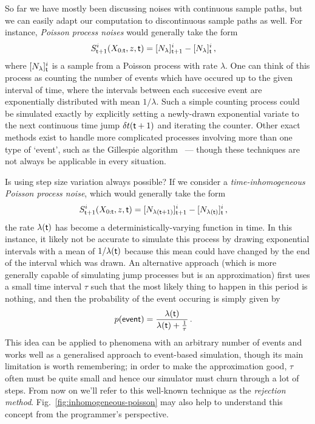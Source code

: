 So far we have mostly been discussing noises with continuous sample paths, but we can easily adapt our computation to discontinuous sample paths as well. For instance, \emph{Poisson process noises} would generally take the form
\begin{align}
S^{i}_{{\sf t}+1}(X_{0:{\sf t}},z,{\sf t}) &= [N_{\lambda}]^i_{{\sf t}+1}-[N_{\lambda}]^i_{\sf t}\,,
\end{align}
where $[N_{\lambda}]^i_{\sf t}$ is a sample from a Poisson process with rate $\lambda$. One can think of this process as counting the number of events which have occured up to the given interval of time, where the intervals between each succesive event are exponentially distributed with mean $1/\lambda$. Such a simple counting process could be simulated exactly by explicitly setting a newly-drawn exponential variate to the next continuous time jump ${\delta t}({\sf t}+1)$ and iterating the counter. Other exact methods exist to handle more complicated processes involving more than one type of `event', such as the Gillespie algorithm~\cite{gillespie1977exact} --- though these techniques are not always be applicable in every situation.

Is using step size variation always possible? If we consider a \emph{time-inhomogeneous Poisson process noise}, which would generally take the form
\begin{align}
S^{i}_{{\sf t}+1}(X_{0:{\sf t}},z,{\sf t}) &= [N_{\lambda ({\sf t}+1)}]^i_{{\sf t}+1}-[N_{\lambda ({\sf t})}]^i_{\sf t}\,,
\end{align}
the rate $\lambda ({\sf t})$ has become a deterministically-varying function in time. In this instance, it likely not be accurate to simulate this process by drawing exponential intervals with a mean of $1/\lambda ({\sf t})$ because this mean could have changed by the end of the interval which was drawn. An alternative approach (which is more generally capable of simulating jump processes but is an approximation) first uses a small time interval $\tau$ such that the most likely thing to happen in this period is nothing, and then the probability of the event occuring is simply given by
\begin{align}
p({\sf event}) &= \frac{\lambda ({\sf t})}{\lambda ({\sf t}) + \frac{1}{\tau}} \label{eq:rejection}\,.
\end{align}
This idea can be applied to phenomena with an arbitrary number of events and works well as a generalised approach to event-based simulation, though its main limitation is worth remembering; in order to make the approximation good, $\tau$ often must be quite small and hence our simulator must churn through a lot of steps. From now on we'll refer to this well-known technique as the \emph{rejection method}. Fig.~\ref{fig:inhomogeneous-poisson} may also help to understand this concept from the programmer's perspective.

